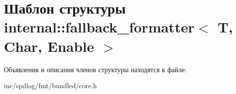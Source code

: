 \hypertarget{structinternal_1_1fallback__formatter}{}\section{Шаблон структуры internal\+:\+:fallback\+\_\+formatter$<$ T, Char, Enable $>$}
\label{structinternal_1_1fallback__formatter}


Объявления и описания членов структуры находятся в файле\+:\begin{DoxyCompactItemize}
\item 
inc/spdlog/fmt/bundled/core.\+h\end{DoxyCompactItemize}
